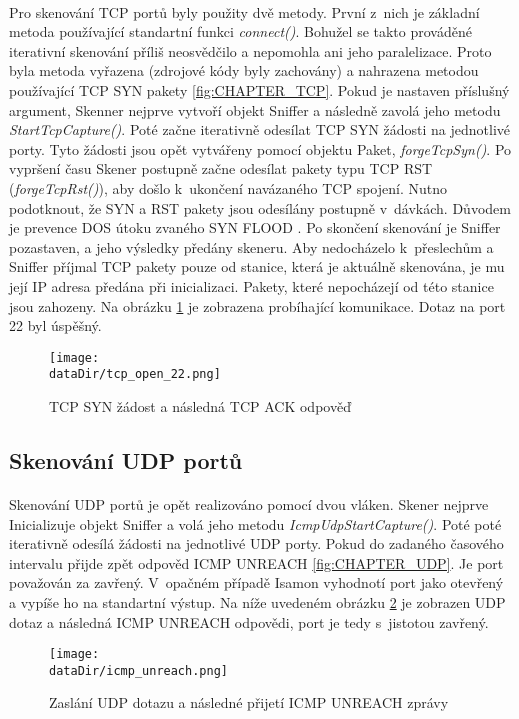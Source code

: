 \documentclass[a4paper,11pt,onecolumn,notitlepage]{article}
\def \dataDir {data}
\begin{document}
\paragraph{} Pro skenování TCP portů byly použity dvě metody. První z~nich je základní metoda používající standartní funkci \emph{connect()}. Bohužel se takto prováděné iterativní skenování příliš neosvědčilo a nepomohla ani jeho paralelizace. Proto byla metoda vyřazena (zdrojové kódy byly zachovány) a nahrazena metodou používající TCP SYN pakety \ref{fig:CHAPTER_TCP}. Pokud je nastaven příslušný argument, Skenner nejprve vytvoří objekt Sniffer a následně zavolá jeho metodu \emph{StartTcpCapture()}. Poté začne iterativně odesílat TCP SYN žádosti na jednotlivé porty. Tyto žádosti jsou opět vytvářeny pomocí objektu Paket, \emph{forgeTcpSyn()}. Po vypršení času Skener postupně začne odesílat pakety typu TCP RST (\emph{forgeTcpRst()}), aby došlo k~ukončení navázaného TCP spojení. Nutno podotknout, že SYN a RST pakety jsou odesílány postupně v~dávkách. Důvodem je prevence DOS útoku zvaného SYN FLOOD \cite{WIKI_SYNFlood}. Po skončení skenování je Sniffer pozastaven, a jeho výsledky předány skeneru. Aby nedocházelo k~přeslechům a Sniffer příjmal TCP pakety pouze od stanice, která je aktuálně skenována, je mu její IP adresa předána při inicializaci. Pakety, které nepocházejí od této stanice jsou zahozeny. Na obrázku \ref{fig:TCP} je zobrazena probíhající komunikace. Dotaz na port 22 byl úspěšný.
\begin{center}
\begin{figure}[h]
    \centering
    \texttt{[image: \\dataDir/tcp\_open\_22.png]}
    \caption{TCP SYN žádost a následná TCP ACK odpověď\label{fig:TCP}}
\end{figure}
\end{center}
\subsection{Skenování UDP portů}
\paragraph{} Skenování UDP portů je opět realizováno pomocí dvou vláken. Skener nejprve Inicializuje objekt Sniffer a volá jeho metodu \emph{IcmpUdpStartCapture()}. Poté poté iterativně odesílá žádosti na jednotlivé UDP porty. Pokud do zadaného časového intervalu přijde zpět odpověd ICMP UNREACH \ref{fig:CHAPTER_UDP}. Je port považován za zavřený. V~opačném případě Isamon vyhodnotí port jako otevřený a vypíše ho na standartní výstup. Na níže uvedeném obrázku \ref{fig:ICMP_UNREACH} je zobrazen UDP dotaz a následná ICMP UNREACH odpovědi, port je tedy s~jistotou zavřený.
\begin{figure}[h]
    \centering
    \texttt{[image: \\dataDir/icmp\_unreach.png]}
    \caption{Zaslání UDP dotazu a následné přijetí ICMP UNREACH zprávy\label{fig:ICMP_UNREACH}}
\end{figure}
\end{document}
